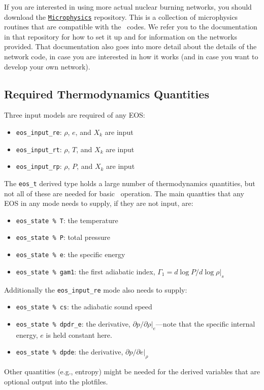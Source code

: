 If you are interested in using more actual nuclear burning networks,
you should download the \href{https://github.com/BoxLib-Codes/Microphysics}{\tt Microphysics} 
repository. This is a collection of microphysics routines that are compatible with the 
\boxlib\ codes. We refer you to the documentation in that repository for how to set it up 
and for information on the networks provided. That documentation 
also goes into more detail about the details of the network code, in case you are interested in 
how it works (and in case you want to develop your own network).

\subsection{Required Thermodynamics Quantities}

Three input models are required of any EOS:
\begin{itemize}
\item {\tt eos\_input\_re}: $\rho$, $e$, and $X_k$ are input
\item {\tt eos\_input\_rt}: $\rho$, $T$, and $X_k$ are input
\item {\tt eos\_input\_rp}: $\rho$, $P$, and $X_k$ are input
\end{itemize}

The {\tt eos\_t} derived type holds a large number of thermodynamics
quantities, but not all of these are needed for basic
\castro\ operation.  The main quantties that any EOS in any mode needs to
supply, if they are not input, are:
\begin{itemize}
  \item {\tt eos\_state \% T}: the temperature
  \item {\tt eos\_state \% P}: total pressure
  \item {\tt eos\_state \% e}: the specific energy
  \item {\tt eos\_state \% gam1}: the first adiabatic index, 
       $\Gamma_1 = d\log P / d\log \rho |_s$
\end{itemize}
Additionally the {\tt eos\_input\_re} mode also needs to supply:
\begin{itemize}
  \item {\tt eos\_state \% cs}: the adiabatic sound speed
  \item {\tt eos\_state \% dpdr\_e}: the derivative, $\partial
    p/\partial \rho |_e$---note that the specific internal energy, $e$
    is held constant here.
  \item {\tt eos\_state \% dpde}: the derivative, $\partial p /
    \partial e |_\rho$
\end{itemize}
Other quantities (e.g., entropy) might be needed for the derived
variables that are optional output into the plotfiles.
